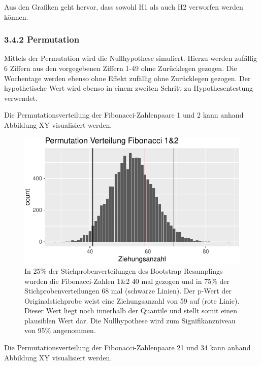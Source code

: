 \documentclass[ngerman,]{article}
\begin{document}
Aus den Grafiken geht hervor, dass sowohl H1 als auch H2 verworfen
werden können.

\subsubsection{3.4.2 Permutation}\label{permutation}

Mittels der Permutation wird die Nullhypothese simuliert. Hierzu werden
zufällig 6 Ziffern aus den vorgegebenen Ziffern 1-49 ohne Zurücklegen
gezogen. Die Wochentage werden ebenso ohne Effekt zufällig ohne
Zurücklegen gezogen. Der hypothetische Wert wird ebenso in einem zweiten
Schritt zu Hypothesentestung verwendet.

Die Permutationsverteilung der Fibonacci-Zahlenpaare 1 und 2 kann anhand
Abbildung XY visualisiert werden.

\begin{figure}

\includegraphics{Abbildung/Permut_1_2-1} \hfill{}

\caption{In 25\% der Stichprobenverteilungen des Bootstrap Resamplings wurden die Fibonacci-Zahlen 1\&2 40 mal gezogen und in 75\% der Stichprobenverteilungen 68 mal (schwarze Linien). Der p-Wert der Originalstichprobe weist eine Ziehungsanzahl von 59 auf (rote Linie). Dieser Wert liegt noch innerhalb der Quantile und stellt somit einen plausiblen Wert dar. Die Nullhypothese wird zum Signifikanzniveau von 95\% angenommen.}\label{fig:Permut_1_2}
\end{figure}

Die Permutationsverteilung der Fibonacci-Zahlenpaare 21 und 34 kann
anhand Abbildung XY visualisiert werden.
\end{document}
